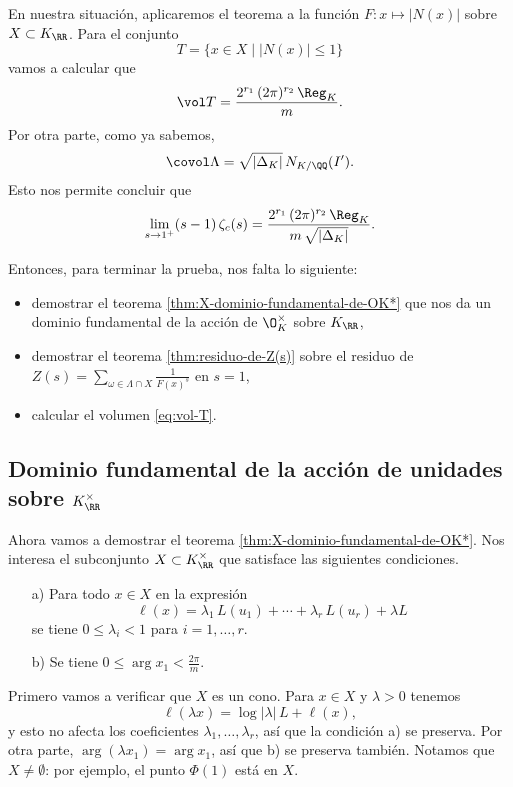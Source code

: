 En nuestra situación, aplicaremos el teorema a la función
$F\colon x \mapsto |N (x)|$ sobre $X \subset K_\RR$. Para el conjunto
$$T = \{ x \in X \mid |N (x)| \le 1 \}$$
vamos a calcular que
\begin{equation}
  \label{eq:vol-T}
  \vol T = \frac{2^{r_1}\,(2\pi)^{r_2}\,\Reg_K}{m}.
\end{equation}
Por otra parte, como ya sabemos,
$$\covol \Lambda = \sqrt{|\Delta_K|}\,N_{K/\QQ} (I').$$
Esto nos permite concluir que
$$\lim_{s\to 1^+} (s-1)\,\zeta_c (s) = \frac{2^{r_1}\,(2\pi)^{r_2}\,\Reg_K}{m\,\sqrt{|\Delta_K|}}.$$

Entonces, para terminar la prueba, nos falta lo siguiente:
\begin{itemize}
\item demostrar el teorema \ref{thm:X-dominio-fundamental-de-OK*} que nos da
  un dominio fundamental de la acción de $\O_K^\times$ sobre $K_\RR$,
\item demostrar el teorema \ref{thm:residuo-de-Z(s)} sobre el residuo de
  $Z (s) = \sum_{\omega \in \Lambda \cap X} \frac{1}{F (x)^s}$ en $s = 1$,
\item calcular el volumen \eqref{eq:vol-T}.
\end{itemize}


\subsection{Dominio fundamental de la acción de unidades sobre \texorpdfstring{$K_\RR^\times$}{Kℝ*}}

Ahora vamos a demostrar el teorema \ref{thm:X-dominio-fundamental-de-OK*}.
Nos interesa el subconjunto $X \subset K_\RR^\times$ que satisface las
siguientes condiciones.
\begin{enumerate}
\item[a)] Para todo $x \in X$ en la expresión
  $$\ell (x) = \lambda_1 \, L (u_1) + \cdots + \lambda_r \, L (u_r) + \lambda L$$
  se tiene $0 \le \lambda_i < 1$ para $i = 1,\ldots,r$.

\item[b)] Se tiene $0 \le \arg x_1 < \frac{2\pi}{m}$.
\end{enumerate}

Primero vamos a verificar que $X$ es un cono. Para $x \in X$ y $\lambda > 0$
tenemos
$$\ell (\lambda x) = \log |\lambda|\,L + \ell (x),$$
y esto no afecta los coeficientes $\lambda_1,\ldots,\lambda_r$, así que la
condición a) se preserva. Por otra parte, $\arg (\lambda x_1) = \arg x_1$,
así que b) se preserva también. Notamos que $X \ne \emptyset$: por ejemplo,
el punto $\Phi (1)$ está en $X$.

